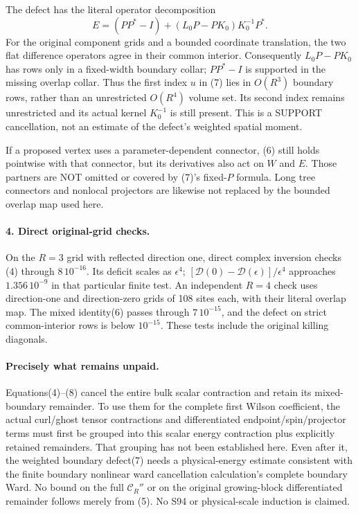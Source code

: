 \documentclass[11pt]{article}
\begin{document}
The defect has the literal operator decomposition
\[
 E=(PP^*-I)+(L_0P-PK_0)K_0^{-1}P^*.                              \tag{8}
\]
For the original component grids and a bounded coordinate translation,
the two flat difference operators agree in their common interior.
Consequently $L_0P-PK_0$ has rows only in a fixed-width boundary collar;
$PP^*-I$ is supported in the missing overlap collar. Thus the first index
$u$ in (7) lies in $O(R^3)$ boundary rows, rather than an unrestricted
$O(R^4)$ volume set. Its second index remains unrestricted and its actual
kernel $K_0^{-1}$ is still present. This is a SUPPORT cancellation, not
an estimate of the defect's weighted spatial moment.

If a proposed vertex uses a parameter-dependent connector, (6) still
holds pointwise with that connector, but its derivatives also act on
$W$ and $E$. Those partners are NOT omitted or covered by (7)'s fixed-$P$
formula. Long tree connectors and nonlocal projectors are likewise not
replaced by the bounded overlap map used here.

\paragraph{4. Direct original-grid checks.}
On the $R=3$ grid with reflected direction one, direct complex inversion
checks (4) through $8\,10^{-16}$. Its deficit scales as $\epsilon^4$;
$[\mathcal D(0)-\mathcal D(\epsilon)]/\epsilon^4$ approaches
$1.356\,10^{-9}$ in that particular finite test.
An independent $R=4$ check uses direction-one and direction-zero grids
of 108 sites each, with their literal overlap map. The mixed identity(6)
passes through $7\,10^{-15}$, and the defect on strict common-interior rows
is below $10^{-15}$. These tests include the original killing diagonals.

\paragraph{Precisely what remains unpaid.}
Equations(4)--(8) cancel the entire bulk scalar contraction and retain its
mixed-boundary remainder. To use them for the complete first Wilson
coefficient, the actual curl/ghost tensor contractions and differentiated
endpoint/spin/projector terms must first be grouped into this scalar
energy contraction plus explicitly retained remainders. That grouping has
not been established here. Even after it, the weighted boundary defect(7)
needs a physical-energy estimate consistent with the finite boundary nonlinear ward cancellation calculation's complete
boundary Ward. No bound on the full $\mathcal C_R''$ or on the original
growing-block differentiated remainder follows merely from (5).
No S94 or physical-scale induction is claimed.
\end{document}
